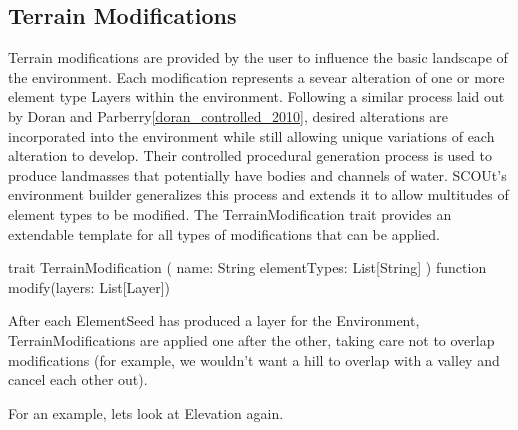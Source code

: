 \subsection{Terrain Modifications}
Terrain modifications are provided by the user to influence the basic landscape of the environment.
Each modification represents a sevear alteration of one or more element type Layers within the environment.
Following a similar process laid out by Doran and Parberry\ref{doran_controlled_2010}, desired alterations are incorporated into the environment while still allowing unique variations of each alteration to develop.
Their controlled procedural generation process is used to produce landmasses that potentially have bodies and channels of water.
SCOUt's environment builder generalizes this process and extends it to allow multitudes of element types to be modified.
The TerrainModification trait provides an extendable template for all types of modifications that can be applied.

trait TerrainModification (
  name: String
  elementTypes: List[String]
) {
  function modify(layers: List[Layer])
}

After each ElementSeed has produced a layer for the Environment, TerrainModifications are applied one after the other, taking care not to overlap modifications (for example, we wouldn't want a hill to overlap with a valley and cancel each other out).

For an example, lets look at Elevation again.

